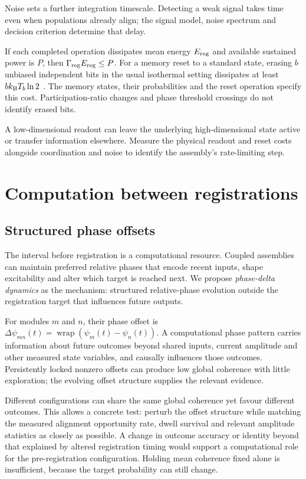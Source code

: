 \documentclass[11pt]{article}
\newcommand{\wrap}{\operatorname{wrap}}
\begin{document}
Noise sets a further integration timescale. Detecting a weak signal takes
time even when populations already align; the signal model, noise
spectrum and decision criterion determine that delay.

If each completed operation dissipates mean energy $E_{\rm reg}$ and
available sustained power is $P$, then
$\Gamma_{\rm reg}E_{\rm reg}\leq P$. For a memory reset to a standard
state, erasing $b$ unbiased independent bits in the usual isothermal
setting dissipates at least $b k_{\rm B}T_b\ln2$
\cite{landauer1961}. The memory states, their probabilities and the reset
operation specify this cost. Participation-ratio changes and phase
threshold crossings do not identify erased bits.

A low-dimensional readout can leave the underlying high-dimensional
state active or transfer information elsewhere. Measure the physical
readout and reset costs alongside coordination and noise to identify the
assembly's rate-limiting step.

\section{Computation between registrations}
\subsection{Structured phase offsets}

The interval before registration is a computational resource. Coupled
assemblies can maintain preferred relative phases that encode recent
inputs, shape excitability and alter which target is reached next. We
propose \emph{phase-delta dynamics} as the mechanism: structured
relative-phase evolution outside the registration target that influences
future outputs.

For modules $m$ and $n$, their phase offset is
$\Delta\psi_{mn}(t)=\wrap(\psi_m(t)-\psi_n(t))$.
A computational phase pattern carries information about future outcomes
beyond shared inputs, current amplitude and other measured state
variables, and causally influences those outcomes. Persistently locked
nonzero offsets can produce low global coherence with little exploration;
the evolving offset structure supplies the relevant evidence.

Different configurations can share the same global coherence
yet favour different outcomes. This allows a concrete test:
perturb the offset structure while matching the measured
alignment opportunity rate, dwell survival and relevant
amplitude statistics as closely as possible. A change in
outcome accuracy or identity beyond that explained by altered
registration timing would support a computational role for
the pre-registration configuration. Holding mean coherence
fixed alone is insufficient, because the target probability
can still change.
\end{document}
